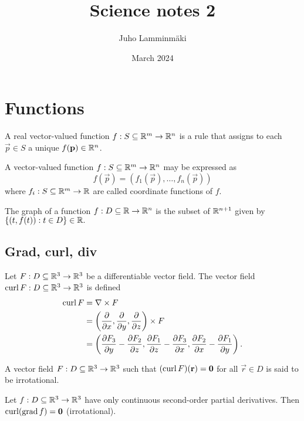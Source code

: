 \documentclass{article}
\title{Science notes 2}
\author{Juho Lamminmäki }
\date{March 2024}
\begin{document}
\maketitle

\section{Functions}
\begin{definition}
    A real vector-valued function $f: S \subseteq \mathbb{R}^m \rightarrow \mathbb{R}^n$
    is a rule that assigns to each $\vec{p} \in S$ a unique $f(\mathbf{p}) \in \mathbb{R}^n$.
\end{definition}
\begin{definition}
    A vector-valued function $f: S \subseteq \mathbb{R}^m \rightarrow \mathbb{R}^n$ may be expressed
    as
    \begin{equation*}
        f(\vec{p}) = (f_1(\vec{p}), \ldots, f_n(\vec{p}))
    \end{equation*}
    where $f_i: S \subseteq \mathbb{R}^m \rightarrow \mathbb{R}$ are called coordinate functions of $f$.
\end{definition}
\begin{definition}
    The graph of a function $f: D \subseteq \mathbb{R} \rightarrow \mathbb{R}^n$ is the subset
    of $\mathbb{R}^{n+1}$ given by $\{(t, f(t)) : t \in D \} \in \mathbb{R}.$
\end{definition}
\subsection{Grad, curl, div}
\begin{definition}[Curl]
    Let $F: D \subseteq \mathbb{R}^3 \rightarrow \mathbb{R}^3$ be a differentiable vector field.
    The vector field $\operatorname{curl} F:  D \subseteq \mathbb{R}^3 \rightarrow \mathbb{R}^3$ is defined
    \begin{align*}
        \operatorname{curl} F & = \nabla \times F                                                                                             \\
                & = \left(\frac{\partial}{\partial x}, \frac{\partial}{\partial y}, \frac{\partial}{\partial z}\right) \times F \\
                & = \left(\frac{\partial F_3}{\partial y} - \frac{\partial F_2}{\partial z},
        \frac{\partial F_1}{\partial z} - \frac{\partial F_3}{\partial x},
        \frac{\partial F_2}{\partial x} - \frac{\partial F_1}{\partial y} \right).
    \end{align*}
\end{definition}
\begin{definition}
    A vector field $F: D \subseteq \mathbb{R}^3 \rightarrow \mathbb{R}^3$ such that
    $(\operatorname{curl} F)(\mathbf{r}) = \mathbf{0}$ for all $\vec{r} \in D$ is said to be irrotational.
\end{definition}
\begin{theorem}
    Let $f: D \subseteq \mathbb{R}^3 \rightarrow \mathbb{R}^3$ have only continuous
    second-order partial derivatives. Then $\operatorname{curl} (\operatorname{grad} f) = \mathbf{0}$ (irrotational).
\end{theorem}
\end{document}
